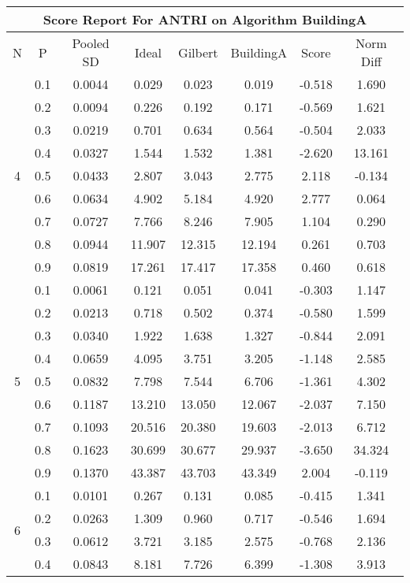\documentclass[11pt,a4paper]{report}
\begin{document}
\begin{longtable}{ | c | c || c | c | c | c | c | c | }
\hline
\multicolumn{8}{|c|}{ Score Report For ANTRI on Algorithm BuildingA} \\
\hline
N & P & Pooled SD &  Ideal &  Gilbert & BuildingA  & Score & Norm Diff \\
 \hline
 \hline
 \endhead
\multirow{9}{*}{4} & 0.1 & 0.0044 & 0.029 & 0.023 & 0.019 & -0.518 & 1.690 \\
 & 0.2 & 0.0094 & 0.226 & 0.192 & 0.171 & -0.569 & 1.621 \\
 & 0.3 & 0.0219 & 0.701 & 0.634 & 0.564 & -0.504 & 2.033 \\
 & 0.4 & 0.0327 & 1.544 & 1.532 & 1.381 & -2.620 & 13.161 \\
 & 0.5 & 0.0433 & 2.807 & 3.043 & 2.775 & 2.118 & -0.134 \\
 & 0.6 & 0.0634 & 4.902 & 5.184 & 4.920 & 2.777 & 0.064 \\
 & 0.7 & 0.0727 & 7.766 & 8.246 & 7.905 & 1.104 & 0.290 \\
 & 0.8 & 0.0944 & 11.907 & 12.315 & 12.194 & 0.261 & 0.703 \\
 & 0.9 & 0.0819 & 17.261 & 17.417 & 17.358 & 0.460 & 0.618 \\
 \hline
\multirow{9}{*}{5} & 0.1 & 0.0061 & 0.121 & 0.051 & 0.041 & -0.303 & 1.147 \\
 & 0.2 & 0.0213 & 0.718 & 0.502 & 0.374 & -0.580 & 1.599 \\
 & 0.3 & 0.0340 & 1.922 & 1.638 & 1.327 & -0.844 & 2.091 \\
 & 0.4 & 0.0659 & 4.095 & 3.751 & 3.205 & -1.148 & 2.585 \\
 & 0.5 & 0.0832 & 7.798 & 7.544 & 6.706 & -1.361 & 4.302 \\
 & 0.6 & 0.1187 & 13.210 & 13.050 & 12.067 & -2.037 & 7.150 \\
 & 0.7 & 0.1093 & 20.516 & 20.380 & 19.603 & -2.013 & 6.712 \\
 & 0.8 & 0.1623 & 30.699 & 30.677 & 29.937 & -3.650 & 34.324 \\
 & 0.9 & 0.1370 & 43.387 & 43.703 & 43.349 & 2.004 & -0.119 \\
 \hline
\multirow{9}{*}{6} & 0.1 & 0.0101 & 0.267 & 0.131 & 0.085 & -0.415 & 1.341 \\
 & 0.2 & 0.0263 & 1.309 & 0.960 & 0.717 & -0.546 & 1.694 \\
 & 0.3 & 0.0612 & 3.721 & 3.185 & 2.575 & -0.768 & 2.136 \\
 & 0.4 & 0.0843 & 8.181 & 7.726 & 6.399 & -1.308 & 3.913 \\

\end{longtable}
\end{document}
